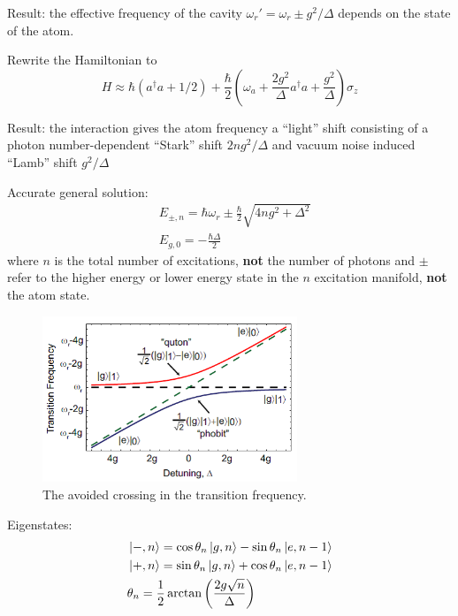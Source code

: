 \documentclass[8pt,a4paper,twocolumn]{article} %
\numberwithin{equation}{section} %
\begin{document}
			Result: the effective frequency of the cavity $ \omega_r'=\omega_r\pm g^2/\Delta $ depends on the state of the atom.

			Rewrite the Hamiltonian to
			\begin{equation}
				H\approx \hbar(a^{\dagger}a+1/2) +\frac{\hbar}{2} \left( \omega_a +\frac{2g^2}{\Delta}a^{\dagger}a + \frac{g^2}{\Delta}\right) \sigma_z
			\end{equation}

			Result: the interaction gives the atom frequency a ``light'' shift consisting of a photon number-dependent ``Stark'' shift $ 2ng^2/\Delta $ and vacuum noise induced ``Lamb'' shift $g^2/\Delta $

			Accurate general solution:
			\begin{align}
				&E_{\pm,n}=\hbar \omega_r\pm \frac{\hbar}{2} \sqrt{4ng^2+\Delta^2}\\
				&E_{g,0}=-\frac{\hbar \Delta}{2}
			\end{align}
			where $n$ is the total number of excitations, \textbf{not} the number of photons and $\pm$ refer to the higher energy or lower energy state in the $n$ excitation manifold, \textbf{not} the atom state.

			\begin{figure}[!h]
				\centering
				\includegraphics[width=3in]{avoidedCross.png}
				\caption{The avoided crossing in the transition frequency. \cite{Schuster2007}}
				\label{pic:avoidedCross}
			\end{figure}

			Eigenstates:
			\begin{align}
				& \ket{-,n} = \cos \theta_n \ket{g,n} -\sin \theta_n \ket{e,n-1}\\
				& \ket{+,n} = \sin \theta_n \ket{g,n} + \cos \theta_n \ket{e,n-1}\\
				& \theta_n = \frac{1}{2} \arctan \left( \frac{2g\sqrt n}{\Delta} \right)
			\end{align}
\end{document}
